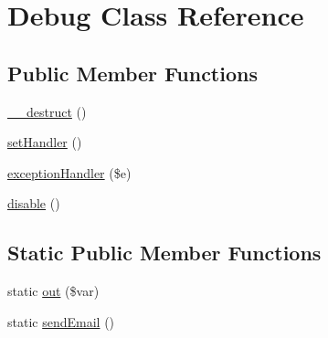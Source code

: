 \hypertarget{class_debug}{\section{Debug Class Reference}
\label{class_debug}
}
\subsection*{Public Member Functions}
\begin{DoxyCompactItemize}
\item 
\hyperlink{class_debug_a421831a265621325e1fdd19aace0c758}{\-\_\-\-\_\-destruct} ()
\item 
\hyperlink{class_debug_a475b1cea5652fafc04c94e97ef82fe83}{set\-Handler} ()
\item 
\hyperlink{class_debug_af17dfe92627c634e9450cf38eaef881b}{exception\-Handler} (\$e)
\item 
\hyperlink{class_debug_a545341e59cc9a0dafc4e265d60d4b5d6}{disable} ()
\end{DoxyCompactItemize}
\subsection*{Static Public Member Functions}
\begin{DoxyCompactItemize}
\item 
static \hyperlink{class_debug_aa7753ac7959d9c3b8c719d1724921afd}{out} (\$var)
\item 
static \hyperlink{class_debug_afab2003e3e8a5d673f58811a1dd27310}{send\-Email} ()
\end{DoxyCompactItemize}
